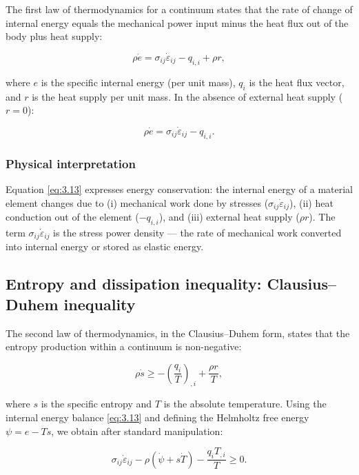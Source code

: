 The first law of thermodynamics for a continuum states that the rate of change of internal energy equals the mechanical power input minus the heat flux out of the body plus heat supply:

\begin{equation}
\rho \dot{e} = \sigma_{ij}\dot{\varepsilon}_{ij} - q_{i,i} + \rho r,
\label{eq:3.13}
\end{equation}

where $e$ is the specific internal energy (per unit mass), $q_i$ is the heat flux vector, and $r$ is the heat supply per unit mass. In the absence of external heat supply ($r = 0$):

\begin{equation}
\rho \dot{e} = \sigma_{ij}\dot{\varepsilon}_{ij} - q_{i,i}.
\label{eq:3.14}
\end{equation}

\subsubsection{Physical interpretation}
Equation \eqref{eq:3.13} expresses energy conservation: the internal energy of a material element changes due to (i) mechanical work done by stresses ($\sigma_{ij}\dot{\varepsilon}_{ij}$), (ii) heat conduction out of the element ($-q_{i,i}$), and (iii) external heat supply ($\rho r$). The term $\sigma_{ij}\dot{\varepsilon}_{ij}$ is the stress power density — the rate of mechanical work converted into internal energy or stored as elastic energy.

\subsection{Entropy and dissipation inequality: Clausius--Duhem inequality}
\label{sec:3.4}

The second law of thermodynamics, in the Clausius--Duhem form, states that the entropy production within a continuum is non-negative:

\begin{equation}
\rho \dot{s} \geq -\left(\frac{q_i}{T}\right)_{,i} + \frac{\rho r}{T},
\label{eq:3.15}
\end{equation}

where $s$ is the specific entropy and $T$ is the absolute temperature. Using the internal energy balance \eqref{eq:3.13} and defining the Helmholtz free energy $\psi = e - Ts$, we obtain after standard manipulation:

\begin{equation}
\sigma_{ij}\dot{\varepsilon}_{ij} - \rho\left(\dot{\psi} + s\dot{T}\right) - \frac{q_i T_{,i}}{T} \geq 0.
\label{eq:3.16}
\end{equation}

